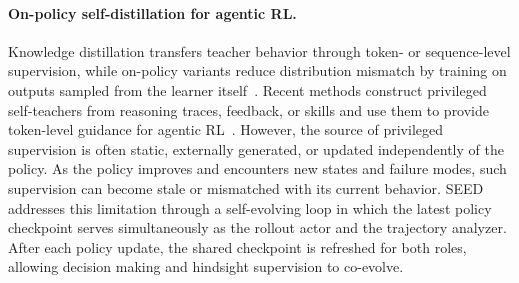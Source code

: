 \paragraph{On-policy self-distillation for agentic RL.}
Knowledge distillation transfers teacher behavior through token- or sequence-level supervision, while on-policy variants reduce distribution mismatch by training on outputs sampled from the learner itself~\citep{hinton2015distilling,kim2016sequence,ross2011reduction,agarwal2024onpolicy}. Recent methods construct privileged self-teachers from reasoning traces, feedback, or skills and use them to provide token-level guidance for agentic RL~\citep{zhao2026selfdistilledreasoner,wang2026skillsd,lu2026sdar,zhong2026sod,yang2026opid}. However, the source of privileged supervision is often static, externally generated, or updated independently of the policy. As the policy improves and encounters new states and failure modes, such supervision can become stale or mismatched with its current behavior. SEED addresses this limitation through a self-evolving loop in which the latest policy checkpoint serves simultaneously as the rollout actor and the trajectory analyzer. After each policy update, the shared checkpoint is refreshed for both roles, allowing decision making and hindsight supervision to co-evolve.